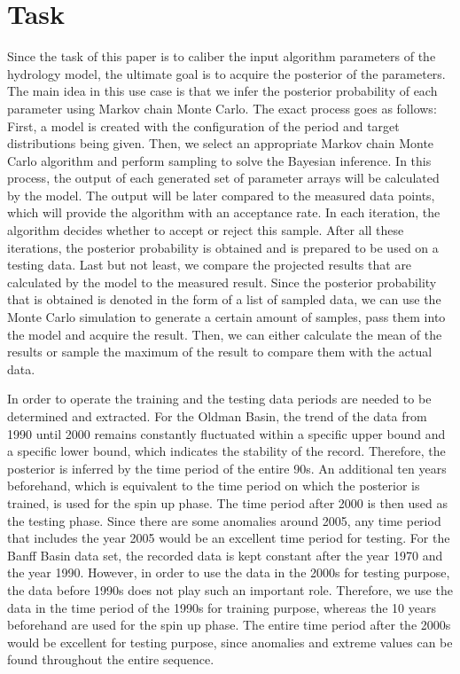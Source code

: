 \section{Task}
Since the task of this paper is to caliber the input algorithm parameters of the hydrology model, the ultimate goal is to acquire the posterior of the parameters. The main idea in this use case is that we infer the posterior probability of each parameter using Markov chain Monte Carlo. The exact process goes as follows: First, a model is created with the configuration of the period and target distributions being given. Then, we select an appropriate Markov chain Monte Carlo algorithm and perform sampling to solve the Bayesian inference. In this process, the output of each generated set of parameter arrays will be calculated by the model. The output will be later compared to the measured data points, which will provide the algorithm with an acceptance rate. In each iteration, the algorithm decides whether to accept or reject this sample. After all these iterations, the posterior probability is obtained and is prepared to be used on a testing data. Last but not least, we compare the projected results that are calculated by the model to the measured result. Since the posterior probability that is obtained is denoted in the form of a list of sampled data, we can use the Monte Carlo simulation to generate a certain amount of samples, pass them into the model and acquire the result. Then, we can either calculate the mean of the results or sample the maximum of the result to compare them with the actual data.

In order to operate the training and the testing data periods are needed to be determined and extracted. For the Oldman Basin, the trend of the data from 1990 until 2000 remains constantly fluctuated within a specific upper bound and a specific lower bound, which indicates the stability of the record. Therefore, the posterior is inferred by the time period of the entire 90s. An additional ten years beforehand, which is equivalent to the time period on which the posterior is trained, is used for the spin up phase. The time period after 2000 is then used as the testing phase. Since there are some anomalies around 2005, any time period that includes the year 2005 would be an excellent time period for testing. For the Banff Basin data set, the recorded data is kept constant after the year 1970 and the year 1990. However, in order to use the data in the 2000s for testing purpose, the data before 1990s does not play such an important role. Therefore, we use the data in the time period of the 1990s for training purpose, whereas the 10 years beforehand are used for the spin up phase. The entire time period after the 2000s would be excellent for testing purpose, since anomalies and extreme values can be found throughout the entire sequence.


